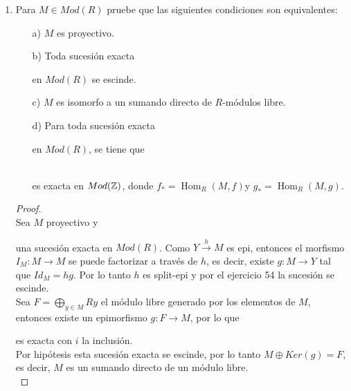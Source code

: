 \documentclass{article}
\begin{document}
\begin{enumerate}[label=\textbf{Ej \arabic*.}]
\item Para $M\in Mod(R)$ pruebe que las siguientes condiciones son equivalentes: 
\begin{itemize}
\item[a)] $M$ es proyectivo.
\item[b)] Toda sucesión exacta 
en $Mod(R)$ se escinde.
\item[c)] $M$ es isomorfo a un sumando directo de $R$-módulos libre.
\item[d)]Para toda sucesión exacta 
 en $Mod(R)$, se tiene que \\
\\
es exacta en $Mod(\mathbb{Z})$, donde $f_*=\operatorname{Hom}_R(M,f)$\quad y \quad $g_*=\operatorname{Hom}_R(M,g)$.
\end{itemize}
\begin{proof}
\\
Sea $M$ proyectivo y 
una sucesión exacta en $Mod(R)$. Como $Y \stackrel{h}{\longrightarrow} M$ es epi, entonces el morfismo $I_M\colon M\longrightarrow M$
se puede factorizar a través de $h$, es decir, existe $g\colon M\longrightarrow Y$ tal que $Id_M=hg$. Por lo tanto $h$ es split-epi y por el 
ejercicio 54 la sucesión se escinde.
 \\
Sea $\displaystyle F=\bigoplus_{y\in M}Ry$ el módulo libre generado por los elementos de $M$, entonces existe un epimorfismo 
$g\colon F\longrightarrow M$, por lo que \\
es exacta con $i$ la inclusión.\\
Por hipótesis esta sucesión exacta se escinde, por lo tanto $M\oplus Ker(g)=F$, es decir, $M$ es un sumando directo de un módulo libre.\\

\end{proof}
\end{enumerate}
\end{document}
